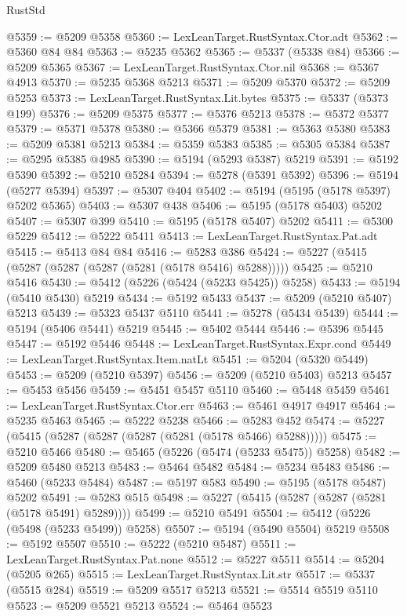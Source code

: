 \begin{lexlean}{RustStd}
\begin{coremodule}
@5359 := @5209 @5358
@5360 := LexLeanTarget.RustSyntax.Ctor.adt
@5362 := @5360 @84 @84
@5363 := @5235 @5362
@5365 := @5337 (@5338 @84)
@5366 := @5209 @5365
@5367 := LexLeanTarget.RustSyntax.Ctor.nil
@5368 := @5367 @4913
@5370 := @5235 @5368 @5213
@5371 := @5209 @5370
@5372 := @5209 @5253
@5373 := LexLeanTarget.RustSyntax.Lit.bytes
@5375 := @5337 (@5373 @199)
@5376 := @5209 @5375
@5377 := @5376 @5213
@5378 := @5372 @5377
@5379 := @5371 @5378
@5380 := @5366 @5379
@5381 := @5363 @5380
@5383 := @5209 @5381 @5213
@5384 := @5359 @5383
@5385 := @5305 @5384
@5387 := @5295 @5385 @4985
@5390 := @5194 (@5293 @5387) @5219
@5391 := @5192 @5390
@5392 := @5210 @5284
@5394 := @5278 (@5391 @5392)
@5396 := @5194 (@5277 @5394)
@5397 := @5307 @404
@5402 := @5194 (@5195 (@5178 @5397) @5202 @5365)
@5403 := @5307 @438
@5406 := @5195 (@5178 @5403) @5202
@5407 := @5307 @399
@5410 := @5195 (@5178 @5407) @5202
@5411 := @5300 @5229
@5412 := @5222 @5411
@5413 := LexLeanTarget.RustSyntax.Pat.adt
@5415 := @5413 @84 @84
@5416 := @5283 @386
@5424 := @5227 (@5415 (@5287 (@5287 (@5287 (@5281 (@5178 @5416) @5288)))))
@5425 := @5210 @5416
@5430 := @5412 (@5226 (@5424 (@5233 @5425)) @5258)
@5433 := @5194 (@5410 @5430) @5219
@5434 := @5192 @5433
@5437 := @5209 (@5210 @5407) @5213
@5439 := @5323 @5437 @5110
@5441 := @5278 (@5434 @5439)
@5444 := @5194 (@5406 @5441) @5219
@5445 := @5402 @5444
@5446 := @5396 @5445
@5447 := @5192 @5446
@5448 := LexLeanTarget.RustSyntax.Expr.cond
@5449 := LexLeanTarget.RustSyntax.Item.natLt
@5451 := @5204 (@5320 @5449)
@5453 := @5209 (@5210 @5397)
@5456 := @5209 (@5210 @5403) @5213
@5457 := @5453 @5456
@5459 := @5451 @5457 @5110
@5460 := @5448 @5459
@5461 := LexLeanTarget.RustSyntax.Ctor.err
@5463 := @5461 @4917 @4917
@5464 := @5235 @5463
@5465 := @5222 @5238
@5466 := @5283 @452
@5474 := @5227 (@5415 (@5287 (@5287 (@5287 (@5281 (@5178 @5466) @5288)))))
@5475 := @5210 @5466
@5480 := @5465 (@5226 (@5474 (@5233 @5475)) @5258)
@5482 := @5209 @5480 @5213
@5483 := @5464 @5482
@5484 := @5234 @5483
@5486 := @5460 (@5233 @5484)
@5487 := @5197 @583
@5490 := @5195 (@5178 @5487) @5202
@5491 := @5283 @515
@5498 := @5227 (@5415 (@5287 (@5287 (@5281 (@5178 @5491) @5289))))
@5499 := @5210 @5491
@5504 := @5412 (@5226 (@5498 (@5233 @5499)) @5258)
@5507 := @5194 (@5490 @5504) @5219
@5508 := @5192 @5507
@5510 := @5222 (@5210 @5487)
@5511 := LexLeanTarget.RustSyntax.Pat.none
@5512 := @5227 @5511
@5514 := @5204 (@5205 @265)
@5515 := LexLeanTarget.RustSyntax.Lit.str
@5517 := @5337 (@5515 @284)
@5519 := @5209 @5517 @5213
@5521 := @5514 @5519 @5110
@5523 := @5209 @5521 @5213
@5524 := @5464 @5523

\end{coremodule}
\end{lexlean}
